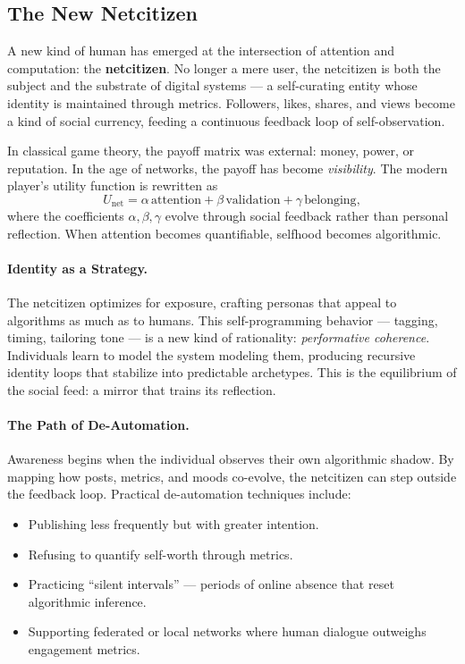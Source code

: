 \documentclass[12pt,twoside]{book}
\begin{document}
\subsection*{The New Netcitizen}

A new kind of human has emerged at the intersection of attention and computation: the \textbf{netcitizen}.  
No longer a mere user, the netcitizen is both the subject and the substrate of digital systems — a self-curating entity whose identity is maintained through metrics.  
Followers, likes, shares, and views become a kind of social currency, feeding a continuous feedback loop of self-observation.  

In classical game theory, the payoff matrix was external: money, power, or reputation.  
In the age of networks, the payoff has become \emph{visibility}.  
The modern player’s utility function is rewritten as
\[
U_{\text{net}} = \alpha \,\text{attention} + \beta \,\text{validation} + \gamma \,\text{belonging},
\]
where the coefficients $\alpha,\beta,\gamma$ evolve through social feedback rather than personal reflection.  
When attention becomes quantifiable, selfhood becomes algorithmic.

\paragraph{Identity as a Strategy.}
The netcitizen optimizes for exposure, crafting personas that appeal to algorithms as much as to humans.  
This self-programming behavior — tagging, timing, tailoring tone — is a new kind of rationality: \emph{performative coherence}.  
Individuals learn to model the system modeling them, producing recursive identity loops that stabilize into predictable archetypes.  
This is the equilibrium of the social feed: a mirror that trains its reflection.

\paragraph{The Path of De-Automation.}
Awareness begins when the individual observes their own algorithmic shadow.  
By mapping how posts, metrics, and moods co-evolve, the netcitizen can step outside the feedback loop.  
Practical de-automation techniques include:
\begin{itemize}
  \item Publishing less frequently but with greater intention.
  \item Refusing to quantify self-worth through metrics.
  \item Practicing ``silent intervals'' — periods of online absence that reset algorithmic inference.
  \item Supporting federated or local networks where human dialogue outweighs engagement metrics.
\end{itemize} 
\end{document}
